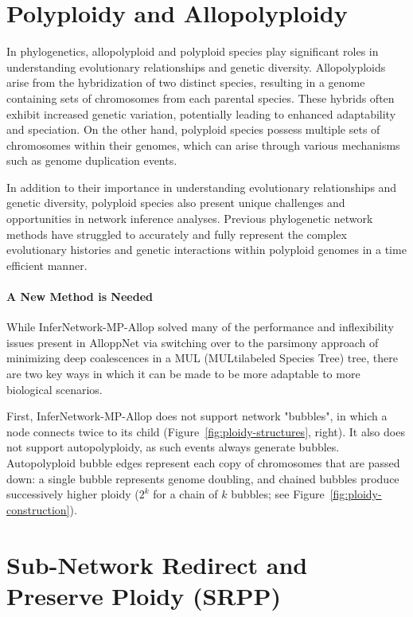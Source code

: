 \documentclass{article}
\begin{document}
\section{Polyploidy and Allopolyploidy}
In phylogenetics, allopolyploid and polyploid species play significant roles in understanding evolutionary relationships and genetic diversity. Allopolyploids arise from the hybridization of two distinct species, resulting in a genome containing sets of chromosomes from each parental species. These hybrids often exhibit increased genetic variation, potentially leading to enhanced adaptability and speciation. On the other hand, polyploid species possess multiple sets of chromosomes within their genomes, which can arise through various mechanisms such as genome duplication events.

In addition to their importance in understanding evolutionary relationships and genetic diversity, polyploid species also present unique challenges and opportunities in network inference analyses. Previous phylogenetic network methods have struggled  to accurately and fully represent the complex evolutionary histories and genetic interactions within polyploid genomes in a time efficient manner.


\paragraph{\color{bluem}A New Method is Needed}

While InferNetwork-MP-Allop solved many of the performance and inflexibility issues present in AlloppNet via switching over to the parsimony approach of minimizing deep coalescences in a MUL (MULtilabeled Species Tree) tree, there are two key ways in which it can be made to be more adaptable to more biological scenarios.

First, InferNetwork-MP-Allop does not support network "bubbles", in which a node connects twice to its child (Figure~\ref{fig:ploidy-structures}, right). It also does not support autopolyploidy, as such events always generate bubbles. Autopolyploid bubble edges represent each copy of chromosomes that are passed down: a single bubble represents genome doubling, and chained bubbles produce successively higher ploidy ($2^k$ for a chain of $k$ bubbles; see Figure~\ref{fig:ploidy-construction}).

\section{Sub-Network Redirect and Preserve Ploidy (SRPP)}
\end{document}

